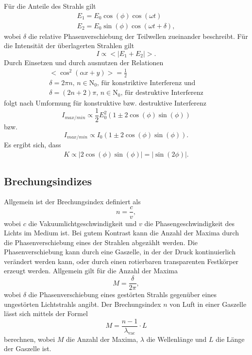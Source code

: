 Für die Anteile des Strahls gilt
\begin{gather*}
  E_1 = E_0\cos(\phi)\cos(\omega t) \\
  E_2 = E_0\sin(\phi)\cos(\omega t + \delta),
\end{gather*}
wobei $\delta$ die relative Phasenverschiebung der Teilwellen zueinander beschreibt.
Für die Intensität der überlagerten Strahlen gilt
\begin{equation*}
  I \propto <|E_1 + E_2|>.
\end{equation*}
Durch Einsetzen und durch ausnutzen der Relationen
\begin{gather*}
  <\cos^2(\alpha x + y)> = \frac{1}{2} \\
  \delta = 2\pi n , \, n\in\mathrm{N}_0,\, \text{für konstriktive Interferenz und} \\
  \delta = (2n+2)\pi,\, n\in\mathrm{N}_0,\, \text{für destruktive Interferenz}
\end{gather*}
folgt nach Umformung für konstruktive bzw. destruktive Interferenz
\begin{equation*}
  I_{max/min} \propto \frac{1}{2}E_0^2 (1 \pm 2\cos(\phi)\sin(\phi))
\end{equation*}
bzw.
\begin{equation}
  I_{max/min} \propto I_0(1 \pm 2\cos(\phi)\sin(\phi)).
\end{equation}
Es ergibt sich, dass
\begin{align*}
  K \propto |2\cos(\phi)\sin(\phi)| = |\sin(2\phi)|.
\end{align*}

\subsection{Brechungsindizes}
Allgemein ist der Brechungsindex definiert als
\begin{equation*}
  n = \frac{c}{v},
\end{equation*}
wobei $c$ die Vakuumlichtgeschwindigkeit und $v$ die Phasengeschwindigkeit des Lichts im Medium ist.
Bei gutem Kontrast kann die Anzahl der Maxima durch die Phasenverschiebung eines
der Strahlen abgezählt werden. Die Phasenverschiebung kann durch eine Gaszelle,
in der der Druck kontinuierlich verändert werden kann, oder durch einen rotierbaren
transparenten Festkörper erzeugt werden.
Allgemein gilt für die Anzahl der Maxima
\begin{equation*}
  M = \frac{\delta}{2\pi},
\end{equation*}
wobei $\delta$ die Phasenverschiebung eines gestörten Strahls gegenüber eines
ungestörten Lichtstrahls angibt.
Der Brechungsindex $n$ von Luft in einer Gaszelle lässt sich mittels der Formel
\begin{equation}
  M = \frac{n-1}{\lambda_{\text{vac}}}\cdot{L}
  \label{eqn:brechluft}
\end{equation}
berechnen,
wobei $M$ die Anzahl der Maxima, $\lambda$ die Wellenlänge und $L$ die Länge der Gaszelle ist.

